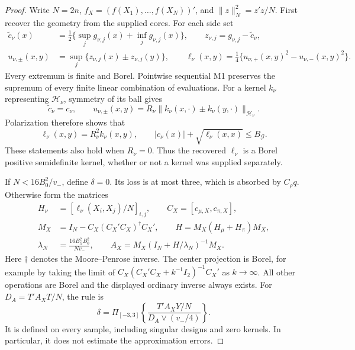 \begin{proof}
Write $N=2n$, $f_X=(f(X_1),\ldots,f(X_N))'$, and
$\|z\|_N^2=z'z/N$.  First recover the geometry from the supplied cores.
For each side set
\begin{equation}
 \begin{aligned}
 \widetilde c_\nu(x)
  &=\tfrac12\{\sup_j g_{\nu,j}(x)+\inf_j g_{\nu,j}(x)\},\qquad
  z_{\nu,j}=g_{\nu,j}-\widetilde c_\nu,\\
 u_{\nu,\pm}(x,y)&=\sup_j\{z_{\nu,j}(x)\pm z_{\nu,j}(y)\},\qquad
 \ell_\nu(x,y)=\tfrac14\{u_{\nu,+}(x,y)^2-u_{\nu,-}(x,y)^2\}.
 \end{aligned}
 \label{eq:hilbert-core-recovery}
\end{equation}
Every extremum is finite and Borel.  Pointwise sequential M1 preserves
the supremum of every finite linear combination of evaluations.  For a
kernel $k_\nu$ representing $\mathcal H_\nu$, symmetry of its ball gives
\[
 \widetilde c_\nu=c_\nu,\qquad
 u_{\nu,\pm}(x,y)
   =R_\nu\|k_\nu(x,\cdot)\pm k_\nu(y,\cdot)\|_{\mathcal H_\nu}.
\]
Polarization therefore shows that
\begin{equation}
 \ell_\nu(x,y)=R_\nu^2k_\nu(x,y),\qquad
 |c_\nu(x)|+\sqrt{\ell_\nu(x,x)}\le B_{\mathcal G}.
 \label{eq:hilbert-kernel-envelope}
\end{equation}
These statements also hold when $R_\nu=0$.  Thus the recovered $\ell_\nu$
is a Borel positive semidefinite kernel, whether or not a kernel was
supplied separately.

If $N<16B_0^2/v_-$, define $\delta=0$.  Its loss is at most three,
which is absorbed by $C_\rho q$.  Otherwise form the matrices
\begin{equation}
 \begin{aligned}
 H_\nu&=[\ell_\nu(X_i,X_j)/N]_{i,j},\qquad
 C_X=[c_{\mu,X},c_{\pi,X}],\\
 M_X&=I_N-C_X(C_X'C_X)^\dagger C_X',\qquad
 H=M_X(H_\mu+H_\pi)M_X,\\
 \lambda_N&=\frac{16B_{\mathcal G}^2B_0^2}{Nv_-},\qquad
 A_X=M_X(I_N+H/\lambda_N)^{-1}M_X.
 \end{aligned}
 \label{eq:hilbert-contraction}
\end{equation}
Here $\dagger$ denotes the Moore--Penrose inverse.  The center projection
is Borel, for example by taking the limit of
$C_X(C_X'C_X+k^{-1}I_2)^{-1}C_X'$ as $k\to\infty$.
All other operations are Borel and the displayed ordinary inverse always
exists.  For $D_A=T'A_XT/N$, the rule is
\begin{equation}
 \delta=\Pi_{[-3,3]}
 \left\{\frac{T'A_XY/N}{D_A\vee(v_-/4)}\right\}.
 \label{eq:hilbert-rule}
\end{equation}
It is defined on every sample, including singular designs and zero
kernels.  In particular, it does not estimate the approximation errors.


\end{proof}
